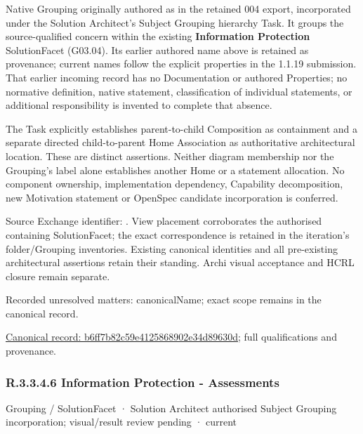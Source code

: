 Native Grouping originally authored as \texttt{} in the retained 004 export,
incorporated under the Solution Architect's Subject Grouping hierarchy Task.
It groups the source-qualified \texttt{} concern within
the existing \textbf{Information Protection} SolutionFacet (G03.04). Its earlier authored name above is retained as provenance; current names
follow the explicit properties in the 1.1.19 submission.
That earlier incoming record has no Documentation or authored Properties; no normative
definition, native statement, classification of individual statements, or
additional responsibility is invented to complete that absence.



The Task explicitly establishes parent-to-child Composition as containment and
a separate directed child-to-parent Home Association as authoritative architectural
location. These are distinct assertions. Neither diagram membership nor the
Grouping's label alone establishes another Home or a statement allocation.
No component ownership, implementation dependency, Capability decomposition,
new Motivation statement or OpenSpec candidate incorporation is conferred.



Source Exchange identifier: \texttt{}. View placement corroborates
the authorised containing SolutionFacet; the exact correspondence is retained in the
iteration's folder/Grouping inventories. Existing canonical identities and all
pre-existing architectural assertions retain their standing. Archi visual
acceptance and HCRL closure remain separate.


{\small Recorded unresolved matters: canonicalName; exact scope remains in the canonical record.}\par
{\footnotesize \href{../../../../../../../continuum/grouping/b6ff7b82c59e4125868902e34d89630d.md}{Canonical record: b6ff7b82c59e4125868902e34d89630d}; full qualifications and provenance.}\par
\subsubsection*{R.3.3.4.6 Information Protection - Assessments}
\label{navigation:R.3.3.4.6}

\label{element:0caf2fb84f944a6ab3872feb92b9338d}
{\small Grouping / SolutionFacet · Solution Architect authorised Subject Grouping incorporation; visual/result review pending · current}\par

